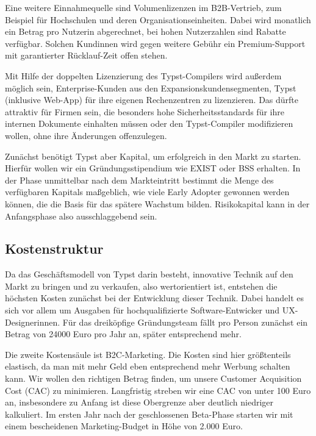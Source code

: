 \documentclass[11pt, a4paper]{article}
\newcommand{\gender}{\raisebox{-.25em}{*}}
\begin{document}
Eine weitere Einnahmequelle sind Volumenlizenzen im B2B-Vertrieb, zum Beispiel für Hochschulen und deren Organisationseinheiten. Dabei wird monatlich ein Betrag pro Nutzer\gender{}in abgerechnet, bei hohen Nutzerzahlen sind Rabatte verfügbar. Solchen Kund\gender{}innen wird gegen weitere Gebühr ein Premium-Support mit garantierter Rücklauf-Zeit offen stehen.

Mit Hilfe der doppelten Lizenzierung des Typst-Compilers wird außerdem möglich sein, Enterprise-Kunden aus den Expansionskundensegmenten, Typst (inklusive Web-App) für ihre eigenen Rechenzentren zu lizenzieren. Das dürfte attraktiv für Firmen sein, die besonders hohe Sicherheitsstandards für ihre internen Dokumente einhalten müssen oder den Typst-Compiler modifizieren wollen, ohne ihre Änderungen offenzulegen.

Zunächst benötigt Typst aber Kapital, um erfolgreich in den Markt zu starten. Hierfür wollen wir ein Gründungsstipendium wie EXIST oder BSS erhalten. In der Phase unmittelbar nach dem Markteintritt bestimmt die Menge des verfügbaren Kapitals maßgeblich, wie viele Early Adopter gewonnen werden können, die die Basis für das spätere Wachstum bilden. Risikokapital kann in der Anfangsphase also ausschlaggebend sein.

\newpage
\subsection*{Kostenstruktur}

Da das Geschäftsmodell von Typst darin besteht, innovative Technik auf den Markt zu bringen und zu verkaufen, also wertorientiert ist, entstehen die höchsten Kosten zunächst bei der Entwicklung dieser Technik. Dabei handelt es sich vor allem um Ausgaben für hochqualifizierte Software-Entwicker\gender{} und UX-Designer\gender{}innen. Für das dreiköpfige Gründungsteam fällt pro Person zunächst ein Betrag von 24000 Euro pro Jahr an, später entsprechend mehr.

Die zweite Kostensäule ist B2C-Marketing. Die Kosten sind hier größtenteils elastisch, da man mit mehr Geld eben entsprechend mehr Werbung schalten kann. Wir wollen den richtigen Betrag finden, um unsere Customer Acquisition Cost (CAC) zu minimieren. Langfristig streben wir eine CAC von unter 100 Euro an, insbesondere zu Anfang ist diese Obergrenze aber deutlich niedriger kalkuliert. Im ersten Jahr nach der geschlossenen Beta-Phase starten wir mit einem bescheidenen Marketing-Budget in Höhe von 2.000 Euro.
\end{document}
